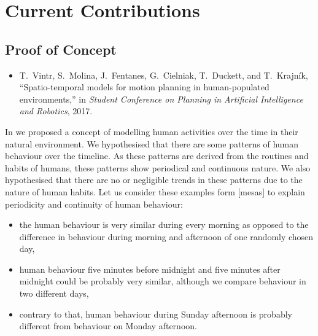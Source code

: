\section{Current Contributions}

\subsection{Proof of Concept}




\begin{itemize}
    \item T.~Vintr, S.~Molina, J.~Fentanes, G.~Cielniak, T.~Duckett, and T.~Krajn{\'i}k, ``Spatio-temporal models for motion planning in human-populated environments,'' in \emph{Student Conference on Planning in Artificial Intelligence and Robotics}, 2017.
\end{itemize}

In \cite{vintr2017spatiotemporal} we proposed a concept of modelling human activities over the time in their natural environment.
We hypothesised that there are some patterns of human behaviour over the timeline.
As these patterns are derived from the routines and habits of humans, these patterns show periodical and continuous nature.
We also hypothesised that there are no or negligible trends in these patterns due to the nature of human habits. 
Let us consider these examples form [mesas] to explain periodicity and continuity of human behaviour:

\begin{itemize}
    \item the human  behaviour is very similar during every morning as opposed to the difference in behaviour during morning and afternoon of one randomly chosen day,
    \item human behaviour five minutes before midnight and five minutes after midnight could be probably very similar, although we compare behaviour in two different days,
    \item contrary to that, human behaviour during Sunday afternoon is probably different from behaviour on Monday afternoon.
\end{itemize}

